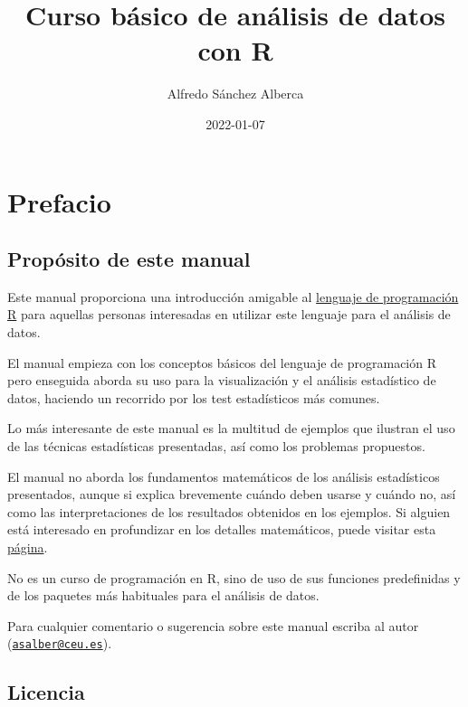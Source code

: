 \documentclass[
]{book}
\title{Curso básico de análisis de datos con R}
\author{Alfredo Sánchez Alberca}
\date{2022-01-07}
\theoremstyle{definition}
\theoremstyle{definition}
\theoremstyle{definition}
\theoremstyle{definition}
\theoremstyle{remark}
\begin{document}
\maketitle

{
\setcounter{tocdepth}{1}
\tableofcontents
}
\hypertarget{prefacio}{%
\chapter*{Prefacio}\label{prefacio}}

\hypertarget{propuxf3sito-de-este-manual}{%
\section*{Propósito de este manual}\label{propuxf3sito-de-este-manual}}

Este manual proporciona una introducción amigable al \href{https://www.r-project.org/}{lenguaje de programación R} para aquellas personas interesadas en utilizar este lenguaje para el análisis de datos.

El manual empieza con los conceptos básicos del lenguaje de programación R pero enseguida aborda su uso para la visualización y el análisis estadístico de datos, haciendo un recorrido por los test estadísticos más comunes.

Lo más interesante de este manual es la multitud de ejemplos que ilustran el uso de las técnicas estadísticas presentadas, así como los problemas propuestos.

El manual no aborda los fundamentos matemáticos de los análisis estadísticos presentados, aunque si explica brevemente cuándo deben usarse y cuándo no, así como las interpretaciones de los resultados obtenidos en los ejemplos. Si alguien está interesado en profundizar en los detalles matemáticos, puede visitar esta \href{https://aprendeconalf.es/docencia/estadistica/}{página}.

No es un curso de programación en R, sino de uso de sus funciones predefinidas y de los paquetes más habituales para el análisis de datos.

Para cualquier comentario o sugerencia sobre este manual escriba al autor (\href{mailto:asalber@ceu.es}{\nolinkurl{asalber@ceu.es}}).

\hypertarget{licencia}{%
\section*{Licencia}\label{licencia}}
\end{document}
